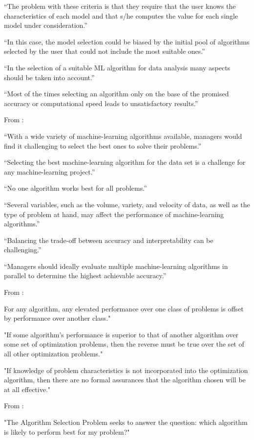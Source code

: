 “The problem with these criteria is that they require that the user knows the characteristics of each model and that s/he computes the value for each single model under consideration.”

“In this case, the model selection could be biased by the initial pool of algorithms selected by the user that could not include the most suitable ones.”

“In the selection of a suitable ML algorithm for data analysis many aspects should be taken into account.”

“Most of the times selecting an algorithm only on the base of the promised accuracy or computational speed leads to unsatisfactory results.”

From \parencite{lee2020machine_learning_enterprises} :

“With a wide variety of machine-learning algorithms available, managers would find it challenging to select the best ones to solve their problems.”

“Selecting the best machine-learning algorithm for the data set is a challenge for any machine-learning project.”

“No one algorithm works best for all problems.”

“Several variables, such as the volume, variety, and velocity of data, as well as the type of problem at hand, may affect the performance of machine-learning algorithms.”

“Balancing the trade-off between accuracy and interpretability can be challenging.”

“Managers should ideally evaluate multiple machine-learning algorithms in parallel to determine the highest achievable accuracy.”

From \parencite{wolpert1997no_free_lunch} :

For any algorithm, any elevated performance over one class of problems is offset by performance over another class."

"If some algorithm's performance is superior to that of another algorithm over some set of optimization problems, then the reverse must be true over the set of all other optimization problems."

"If knowledge of problem characteristics is not incorporated into the optimization algorithm, then there are no formal assurances that the algorithm chosen will be at all effective."

From \parencite{smith_miles2009algorithm_selection} :

"The Algorithm Selection Problem seeks to answer the question: which algorithm is likely to perform best for my problem?"

